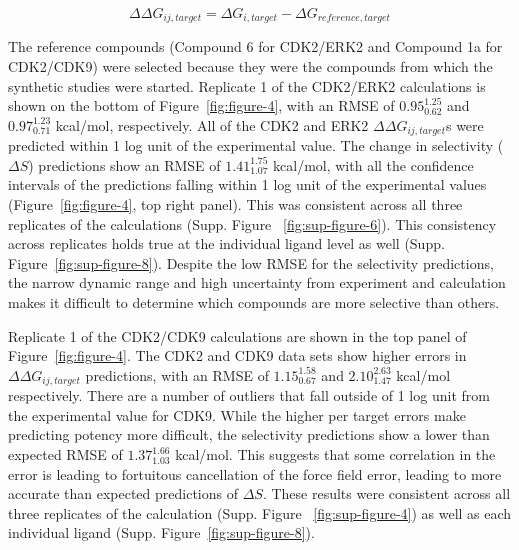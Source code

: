 \documentclass[phd,tocprelim]{cornell}
\begin{document}
\begin{equation}
\Delta \Delta G_{ij, target} = \Delta G_{i, target} - \Delta G_{reference, target} 
\end{equation}

The reference compounds (Compound 6 for CDK2/ERK2 and Compound 1a for CDK2/CDK9) were selected because they were the compounds from which the synthetic studies were started. Replicate 1 of the CDK2/ERK2 calculations is shown on the bottom of Figure~\ref{fig:figure-4}, with an RMSE of $0.95^{1.25}_{0.62}$ and $0.97^{1.23}_{0.71}$ kcal/mol, respectively. All of the CDK2 and ERK2 $\Delta \Delta G_{ij, target}$s were predicted within 1 log unit of the experimental value. The change in selectivity ($\Delta S$) predictions show an RMSE of $1.41^{1.75}_{1.07}$ kcal/mol, with all the confidence intervals of the predictions falling within 1 log unit of the experimental values (Figure~\ref{fig:figure-4}, top right panel). This was consistent across all three replicates of the calculations (Supp. Figure ~\ref{fig:sup-figure-6}). This consistency across replicates holds true at the individual ligand level as well (Supp. Figure~\ref{fig:sup-figure-8}). Despite the low RMSE for the selectivity predictions, the narrow dynamic range and high uncertainty from experiment and calculation makes it difficult to determine which compounds are more selective than others. 

Replicate 1 of the CDK2/CDK9 calculations are shown in the top panel of Figure~\ref{fig:figure-4}. The CDK2 and CDK9 data sets show higher errors in $\Delta \Delta G_{ij, target}$ predictions, with an RMSE of $1.15^{1.58}_{0.67}$ and $2.10^{2.63}_{1.47}$ kcal/mol respectively. There are a number of outliers that fall outside of 1 log unit from the experimental value for CDK9. While the higher per target errors make predicting potency more difficult, the selectivity predictions show a lower than expected RMSE of $1.37^{1.66}_{1.03}$ kcal/mol. This suggests that some correlation in the error is leading to fortuitous cancellation of the force field error, leading to more accurate than expected predictions of $\Delta S$. These results were consistent across all three replicates of the calculation (Supp. Figure ~\ref{fig:sup-figure-4}) as well as each individual ligand (Supp. Figure~\ref{fig:sup-figure-8}). 
\end{document}
